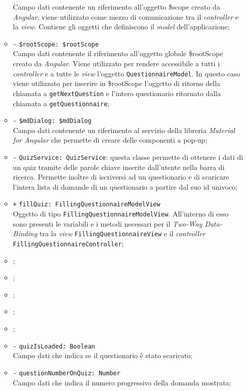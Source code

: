 \begin{itemize}
\begin{itemize}
		Campo dati contenente un riferimento all'oggetto \$scope creato da \textit{Angular}, viene utilizzato come mezzo di comunicazione tra il \textit{controller} e la \textit{view}. Contiene gli oggetti che definiscono il \textit{model} dell'applicazione;
		\item \texttt{-} \texttt{\$rootScope: \$rootScope} \\
		Campo dati contenente il riferimento all'oggetto globale \$rootScope creato da \textit{Angular}. Viene utilizzato per rendere accessibile a tutti i \textit{controller} e a tutte le \textit{view} l'oggetto \texttt{QuestionnaireModel}. In questo caso viene utilizzato per inserire in \$rootScope l'oggetto di ritorno della chiamata a \texttt{getNextQuestion} e l'intero questionario ritornato dalla chiamata a \texttt{getQuestionnaire};
		\item \texttt{-} \texttt{\$mdDialog: \$mdDialog} \\
		Campo dati contenente un riferimento al servizio della libreria \textit{Material for Angular} che permette di creare delle componenti a pop-up;
		\item \texttt{-} \texttt{QuizService: QuizService}: questa classe permette di ottenere i dati di un quiz tramite delle parole chiave inserite dall'utente nella barra di ricerca. Permette inoltre di iscriversi ad un questionario e di scaricare l'intera lista di domande di un questionario a partire dal suo id univoco;
		\item \texttt{+} \texttt{fillQuiz: FillingQuestionnaireModelView} \\
		Oggetto di tipo \texttt{FillingQuestionnaireModelView}. All'interno di esso sono presenti le variabili e i metodi necessari per il \textit{Two-Way Data-Binding} tra la \textit{view} \texttt{FillingQuestionnaireView} e il \textit{controller} \texttt{FillingQuestionnaireController};
		\item \locationA;
		\item \routeparamsA;
		\item \errorinfomodelA;
		\item \questionnairemodelA;
		\item \timeoutA;
		\item \texttt{-} \texttt{quizIsLoaded: Boolean} \\ Campo dati che indica se il questionario è stato scaricato;
		\item \texttt{-} \texttt{questionNumberOnQuiz: Number} \\ Campo dati che indica il numero progressivo della domanda mostrata;

\end{itemize}
\end{itemize}
